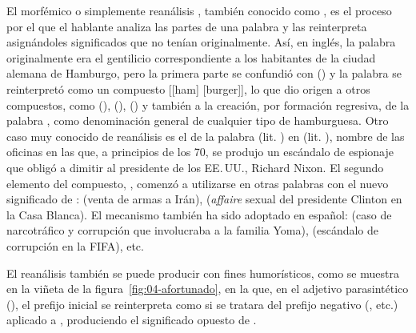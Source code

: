 El  morfémico o simplemente reanálisis
\parencite{escandell2011}, también conocido como , es
el proceso por el que el hablante analiza las partes de una palabra y las
reinterpreta asignándoles significados que no tenían originalmente. Así, en
inglés, la palabra  originalmente era el gentilicio
correspondiente a los habitantes de la ciudad alemana de Hamburgo, pero la
primera parte se confundió con  () y la palabra se
reinterpretó como un compuesto [[ham] [burger]], lo que dio origen a otros
compuestos, como  (),
 (), 
() y también a la creación, por formación regresiva,
de la palabra , como denominación general de cualquier tipo de
hamburguesa. Otro caso muy conocido de reanálisis es el de la palabra
 (lit. ) en  (lit. ), nombre de las oficinas en las que, a principios de los 70, se produjo un
escándalo de espionaje que obligó a dimitir al presidente de los EE.\,UU.,
Richard Nixon. El segundo elemento del compuesto, , comenzó a
utilizarse en otras palabras con el nuevo significado de :  (venta de armas a Irán), 
(\textit{affaire} sexual del presidente Clinton en la Casa Blanca). El mecanismo
también ha sido adoptado en español:  (caso de narcotráfico y
corrupción que involucraba a la familia Yoma),  (escándalo de
corrupción en la FIFA), etc.

El reanálisis también se puede producir con fines humorísticos, como se muestra
en la viñeta de la figura~\ref{fig:04-afortunado}, en la que, en el adjetivo
parasintético  (), el
prefijo inicial se reinterpreta como si se tratara del prefijo negativo
 (, etc.) aplicado a ,
produciendo el significado opuesto de .



